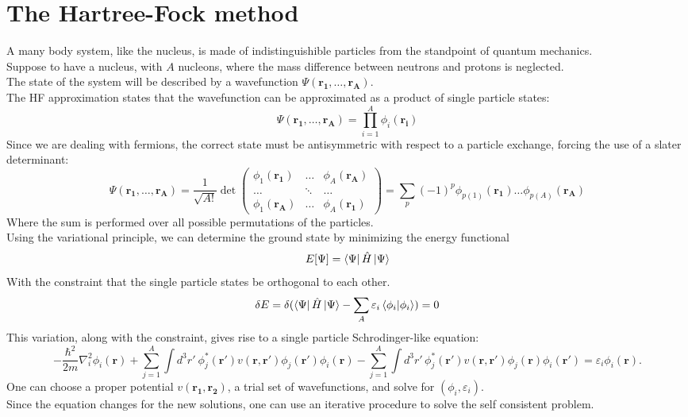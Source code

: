 \section{The Hartree-Fock method}
A many body system, like the nucleus, is made of indistinguishible particles from the standpoint of quantum mechanics.
\\Suppose to have a nucleus, with $A$ nucleons, where the mass difference between neutrons and protons is neglected.
\\The state of the system will be described by a wavefunction $\Psi(\mathbf{r_1}, \ldots, \mathbf{r_A})$.
\\The HF approximation states that the wavefunction can be approximated as a product of single particle states:
\begin{equation}
    \Psi(\mathbf{r_1}, \ldots, \mathbf{r_A}) = \prod_{i=1}^A \phi_i(\mathbf{r_i})
\end{equation}
Since we are dealing with fermions, the correct state must be antisymmetric with respect to a particle exchange, forcing the use of a slater determinant:
\begin{equation}
    \Psi(\mathbf{r_1}, \ldots, \mathbf{r_A}) = \frac{1}{\sqrt{A!}}\det
    \begin{pmatrix}
        \phi_1(\mathbf{r_1}) & \ldots & \phi_A(\mathbf{r_A}) \\
        \ldots & \ddots & \ldots \\
        \phi_1(\mathbf{r_A}) & \ldots & \phi_A(\mathbf{r_1})
    \end{pmatrix}
    =\sum_{p} (-1)^p \phi_{p(1)}(\mathbf{r_1}) \ldots \phi_{p(A)}(\mathbf{r_A})
\end{equation}
Where the sum is performed over all possible permutations of the particles.
\\Using the variational principle, we can determine the ground state by minimizing the energy functional
\begin{equation}
    \label{eq:energy_functional}
    E[\Psi] = \bra{\Psi} \hat{H} \ket{\Psi}
\end{equation}
With the constraint that the single particle states be orthogonal to each other.
\begin{equation}
    \label{eq:energy_variation}
    \delta E = \delta(\bra{\Psi} \hat{H} \ket{\Psi} - \sum_A \varepsilon_i\braket{\phi_i | \phi_i} ) = 0
\end{equation}
This variation, along with the constraint, gives rise to a single particle Schrodinger-like equation:
\begin{equation}
-\frac{\hbar^2}{2m} \nabla_i^2 \phi_i(\mathbf{r}) + \sum_{j=1}^A \int d^3 r' \ \phi_j^*(\mathbf{r}') v(\mathbf{r}, \mathbf{r}') \phi_j(\mathbf{r}') \phi_i(\mathbf{r}) - \sum_{j=1}^A \int d^3 r' \, \phi_j^*(\mathbf{r}') v(\mathbf{r}, \mathbf{r}') \phi_j(\mathbf{r}) \phi_i(\mathbf{r}') = \varepsilon_i \phi_i(\mathbf{r}).
\end{equation}
One can choose a proper potential $v(\mathbf{r_1}, \mathbf{r_2})$, a trial set of wavefunctions, and solve for $(\phi_i, \varepsilon_i)$.
\\Since the equation changes for the new solutions, one can use an iterative procedure to solve the self consistent problem.